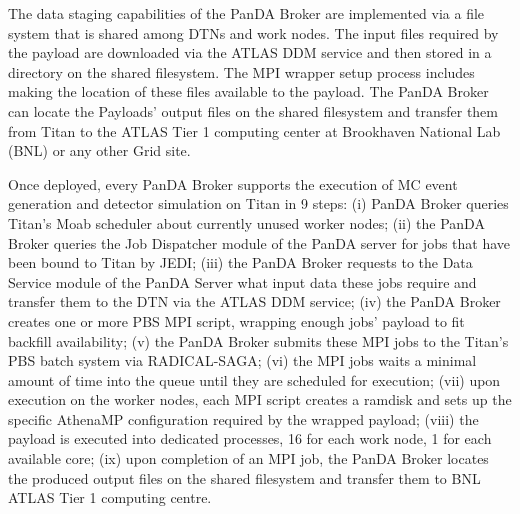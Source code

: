 The data staging capabilities of the PanDA Broker are implemented via a file
system that is shared among DTNs and work nodes. The input files required by the
payload are downloaded via the ATLAS DDM service and then stored in a directory
on the shared filesystem. The MPI wrapper setup process includes making the
location of these files available to the payload. The PanDA Broker can locate
the Payloads' output files on the shared filesystem and transfer them from Titan
to the ATLAS Tier 1 computing center at Brookhaven National Lab (BNL) or any
other Grid site.

Once deployed, every PanDA Broker supports the execution of MC event generation
and detector simulation on Titan in 9 steps: (i) PanDA Broker queries Titan's
Moab scheduler about currently unused worker nodes;
(ii) the PanDA Broker queries the Job Dispatcher module of the PanDA server for
jobs that have been bound to Titan by JEDI; (iii)  the PanDA Broker requests to
the Data Service module of the PanDA Server what input data these jobs require
and transfer them to the DTN via the ATLAS DDM service; (iv) the PanDA Broker
creates one or more PBS MPI script, wrapping enough jobs' payload to fit
backfill availability; (v) the PanDA Broker submits these MPI jobs to the
Titan's PBS batch system via RADICAL-SAGA; (vi) the MPI jobs waits a minimal
amount of time into the queue until they are scheduled for execution; (vii) upon
execution on the worker nodes, each MPI script creates a ramdisk and sets up the
specific AthenaMP configuration required by the wrapped payload; (viii) the
payload is executed into dedicated processes, 16 for each work node, 1 for each
available core; (ix) upon completion of an MPI job, the PanDA Broker locates the
produced output files on the shared filesystem and transfer them to BNL ATLAS
Tier 1 computing centre.




